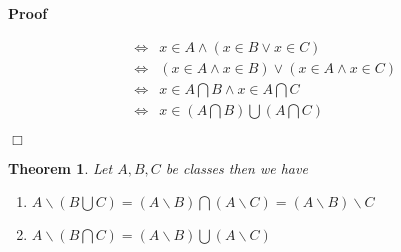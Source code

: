 \documentclass{book}
\newenvironment{proof}{\noindent\textbf{Proof\ }}{\hspace*{\fill}$\Box$\medskip}
\newtheorem{theorem}{Theorem}
\begin{document}
\begin{proof}
\begin{description}
\begin{enumerate}
\begin{eqnarray*}
        & \Leftrightarrow & x \in A \wedge (x \in B \vee x \in C)\\
        & \Leftrightarrow & (x \in A \wedge x \in B) \vee (x \in A \wedge x
        \in C)\\
        & \Leftrightarrow & x \in A \bigcap B \wedge x \in A \bigcap C\\
        & \Leftrightarrow & x \in \left( A \bigcap B \right) \bigcup \left( A
        \bigcap C \right)
      \end{eqnarray*}
    \end{enumerate}
  \end{description}
\end{proof}

\begin{theorem}
  \label{class set difference and union , intersection}Let $A, B, C$ be
  classes then we have
  \begin{enumerate}
    \item $A\backslash \left( B \bigcup C \right) = (A\backslash B) \bigcap
    (A\backslash C) = (A\backslash B) \backslash C$
    
    \item $A\backslash \left( B \bigcap C \right) = (A\backslash B) \bigcup
    (A\backslash C)$
  \end{enumerate}
\end{theorem}
\end{document}
